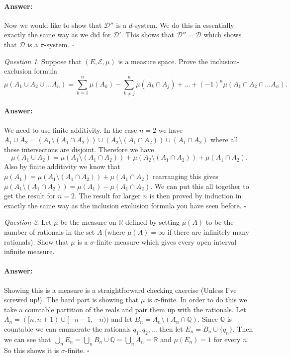 \documentclass[11pt]{article}
\theoremstyle{definition}
\theoremstyle{remark}
\newtheorem{q}{Question}
\newenvironment{ans}{\paragraph{Answer:}}{\hfill$\square$}
\begin{document}
\begin{ans}
Now we would like to show that $\mathcal{D}''$ is a $d$-system. We do this in essentially exactly the same way as we did for $\mathcal{D}'$. This shows that $\mathcal{D}''= \mathcal{D}$ which shows that $\mathcal{D}$ is a $\pi$-system. 
\end{ans}

\vspace{10pt}

\begin{q}
Suppose that $(E, \mathcal{E}, \mu)$ is a measure space. Prove the inclusion-exclusion formula
\[ \mu(A_1 \cup A_2 \cup \dots A_n) = \sum_{k=1}^n \mu(A_k)- \sum_{k \neq j}^n \mu(A_k \cap A_j) + \dots + (-1)^n \mu(A_1 \cap A_2 \cap \dots A_n). \]
\end{q}
\begin{ans}
We need to use finite additivity. In the case $n=2$ we have $A_1 \cup A_2 = (A_1 \setminus (A_1 \cap A_2))\cup(A_2 \setminus (A_1 \cap A_2)) \cup (A_1 \cap A_2)$ where all these intersectons are disjoint. Therefore we have
\[ \mu(A_1 \cup A_2) = \mu(A_1 \setminus (A_1 \cap A_2)) + \mu(A_2 \setminus (A_1 \cap A_2)) + \mu(A_1 \cap A_2). \] Also by finite additivity we know that $\mu(A_1) = \mu(A_1 \setminus (A_1 \cap A_2)) + \mu(A_1 \cap A_2)$ rearranging this gives $\mu(A_1 \setminus (A_1 \cap A_2)) = \mu(A_1) - \mu(A_1 \cap A_2)$. We can put this all together to get the result for $n=2$. The result for larger $n$ is then proved by induction in exactly the same way as the inclusion exclusion formula you have seen before.
\end{ans}

\vspace{10pt}


\begin{q}
Let $\mu$ be the measure on $\mathbb{R}$ defined by setting $\mu(A)$ to be the number of rationals in the set $A$ (where $\mu(A) = \infty$ if there are infinitely many rationals). Show that $\mu$ is a $\sigma$-finite measure which gives every open interval infinite measure. 
\end{q}
\begin{ans}
Showing this is a measure is a straightforward checking exercise (Unless I've screwed up!). The hard part is showing that $\mu$ is $\sigma$-finite. In order to do this we take a countable partition of the reals and pair them up with the rationals. Let $A_n = ([n,n+1) \cup [-n-1, -n))$ and let $B_n = A_n \setminus (A_n \cap \mathbb{Q})$. Since $\mathbb{Q}$ is countable we can enumerate the rationals $q_1, q_2, \dots$ then let $E_n = B_n \cup \{q_n\}$. Then we can see that $\bigcup_n E_n = \bigcup_n B_n \cup \mathbb{Q} = \bigcup_n A_n = \mathbb{R}$ and $\mu(E_n) = 1$ for every $n$. So this shows it is $\sigma$-finite.
\end{ans}
\end{document}
